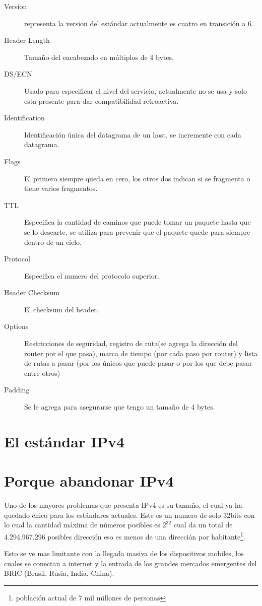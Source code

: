 \documentclass[11pt,a4paper]{article}
\begin{document}
\begin{description}

\item[Version] representa la version del estándar actualmente es cuatro en transición a 6.
\item[Header Length] Tamaño del encabezado en múltiplos de 4 bytes.
\item[DS/ECN] Usado para especificar el nivel del servicio, actualmente no se usa y solo esta
presente para dar compatibilidad retroactiva.
\item[Identification] Identificación única del datagrama de un host, se incremente con cada 
datagrama.
\item[Flags] El primero siempre queda en cero, los otros dos indican si se fragmenta o tiene varios
fragmentos.
\item[TTL] Especifica la cantidad de caminos que puede tomar un paquete hasta que se lo descarte, se
utiliza para prevenir que el paquete quede para siempre dentro de un ciclo.
\item[Protocol] Especifica el numero del protocolo superior.
\item[Header Checksum] El checksum del header.
\item[Options] Restricciones de seguridad, registro de ruta(se agrega la dirección del router por el 
que pasa), marca de tiempo (por cada paso por router) y lista de rutas a pasar (por los únicos que 
puede pasar o por los que debe pasar entre otros)
\item[Padding] Se le agrega para asegurarse que tengo un tamaño de 4 bytes.

\end{description}


\section{El estándar IPv4}

\section{Porque abandonar IPv4}
Uno de los mayores problemas que presenta IPv4 es su tamaño, el cual ya ha quedado chico para los
estándares actuales. Este es un numero de solo 32bits con lo cual la cantidad máxima de números
posibles es $2^{32}$ cual da un total de 4.294.967.296 posibles dirección eso es menos de una
dirección por habitante\footnote{población actual de 7 mil millones de personas}.\par
Esto se ve mas limitante con la llegada masiva de los dispositivos mobiles, los cuales se conectan
a internet y la entrada de los grandes mercados emergentes del BRIC (Brasil, Rusia, India, China).
\end{document}
